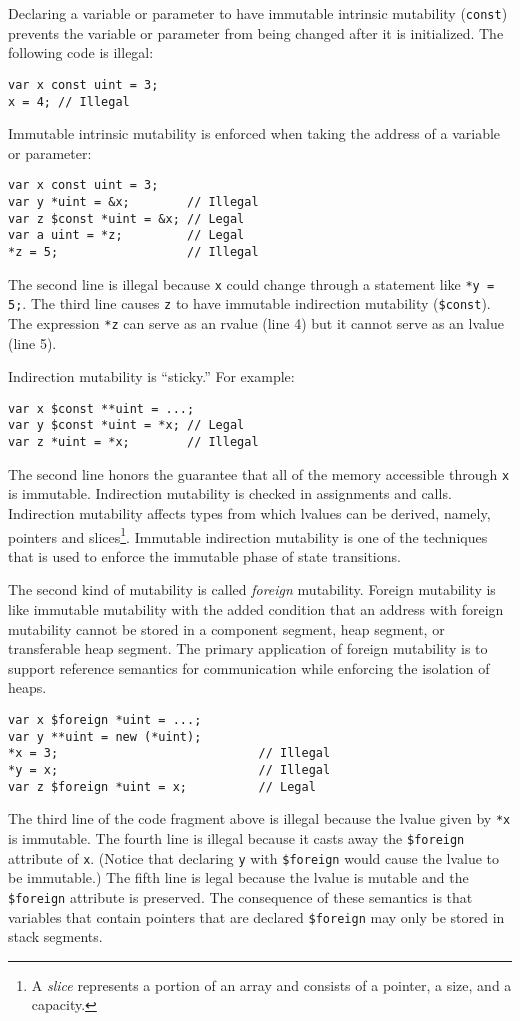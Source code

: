 Declaring a variable or parameter to have immutable intrinsic mutability (\verb+const+) prevents the variable or parameter from being changed after it is initialized.
The following code is illegal:
\begin{verbatim}
var x const uint = 3;
x = 4; // Illegal
\end{verbatim}
Immutable intrinsic mutability is enforced when taking the address of a variable or parameter:
\begin{verbatim}
var x const uint = 3;
var y *uint = &x;        // Illegal
var z $const *uint = &x; // Legal
var a uint = *z;         // Legal
*z = 5;                  // Illegal
\end{verbatim}
The second line is illegal because \verb+x+ could change through a statement like \verb+*y = 5;+.
The third line causes \verb+z+ to have immutable indirection mutability (\verb|$const|).
The expression \verb+*z+ can serve as an rvalue (line 4) but it cannot serve as an lvalue (line 5).

Indirection mutability is ``sticky.''
For example:
\begin{verbatim}
var x $const **uint = ...;
var y $const *uint = *x; // Legal
var z *uint = *x;        // Illegal
\end{verbatim}
The second line honors the guarantee that all of the memory accessible through \verb+x+ is immutable.
Indirection mutability is checked in assignments and calls.
Indirection mutability affects types from which lvalues can be derived, namely, pointers and slices\footnote{A \emph{slice} represents a portion of an array and consists of a pointer, a size, and a capacity.}.
Immutable indirection mutability is one of the techniques that is used to enforce the immutable phase of state transitions.

The second kind of mutability is called \emph{foreign} mutability.
Foreign mutability is like immutable mutability with the added condition that an address with foreign mutability cannot be stored in a component segment, heap segment, or transferable heap segment.
The primary application of foreign mutability is to support reference semantics for communication while enforcing the isolation of heaps.
\begin{verbatim}
var x $foreign *uint = ...;
var y **uint = new (*uint);
*x = 3;                            // Illegal
*y = x;                            // Illegal
var z $foreign *uint = x;          // Legal
\end{verbatim}
The third line of the code fragment above is illegal because the lvalue given by \verb+*x+ is immutable.
The fourth line is illegal because it casts away the \verb|$foreign| attribute of \verb+x+.
(Notice that declaring \verb+y+ with \verb|$foreign| would cause the lvalue to be immutable.)
The fifth line is legal because the lvalue is mutable and the \verb|$foreign| attribute is preserved.
The consequence of these semantics is that variables that contain pointers that are declared \verb|$foreign| may only be stored in stack segments.

